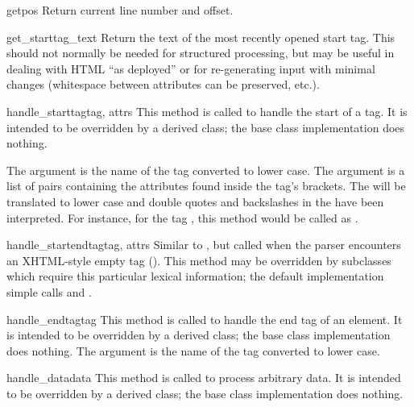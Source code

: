 \begin{methoddesc}{getpos}{}
Return current line number and offset.
\end{methoddesc}

\begin{methoddesc}{get_starttag_text}{}
Return the text of the most recently opened start tag.  This should
not normally be needed for structured processing, but may be useful in
dealing with HTML ``as deployed'' or for re-generating input with
minimal changes (whitespace between attributes can be preserved,
etc.).
\end{methoddesc}

\begin{methoddesc}{handle_starttag}{tag, attrs} 
This method is called to handle the start of a tag.  It is intended to
be overridden by a derived class; the base class implementation does
nothing.  

The  argument is the name of the tag converted to
lower case.  The  argument is a list of  pairs containing the attributes found inside the tag's
\code{<>} brackets.  The  will be translated to lower case
and double quotes and backslashes in the  have been
interpreted.  For instance, for the tag , this method would be called as
.
\end{methoddesc}

\begin{methoddesc}{handle_startendtag}{tag, attrs}
Similar to , but called when the parser
encounters an XHTML-style empty tag ().  This method
may be overridden by subclasses which require this particular lexical
information; the default implementation simple calls
 and .
\end{methoddesc}

\begin{methoddesc}{handle_endtag}{tag}
This method is called to handle the end tag of an element.  It is
intended to be overridden by a derived class; the base class
implementation does nothing.  The  argument is the name of
the tag converted to lower case.
\end{methoddesc}

\begin{methoddesc}{handle_data}{data}
This method is called to process arbitrary data.  It is intended to be
overridden by a derived class; the base class implementation does
nothing.
\end{methoddesc}

